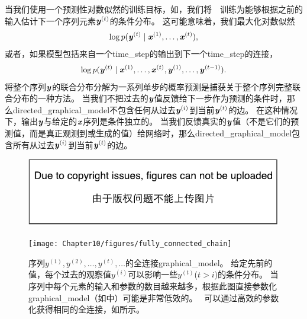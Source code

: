 当我们使用一个预测性对数似然的训练目标，如，我们将~~训练为能够根据之前的输入估计下一个序列元素$\boldsymbol{\mathit{y}}^{(t)}$的条件分布。
这可能意味着，我们最大化对数似然
\begin{align}
 \log p(\boldsymbol{\mathit{y}}^{(t)} \mid \boldsymbol{\mathit{x}}^{(1)},\dots, \boldsymbol{\mathit{x}}^{(t)}),
\end{align}
或者，如果模型包括来自一个\gls{time_step}的输出到下一个\gls{time_step}的连接，
\begin{align}
 \log p(\boldsymbol{\mathit{y}}^{(t)} \mid \boldsymbol{\mathit{x}}^{(1)},\dots, \boldsymbol{\mathit{x}}^{(t)},\boldsymbol{\mathit{y}}^{(1)},\dots, \boldsymbol{\mathit{y}}^{(t-1)} ).
\end{align}
将整个序列$\boldsymbol{\mathit{y}}$的联合分布分解为一系列单步的概率预测是捕获关于整个序列完整联合分布的一种方法。
当我们不把过去的$\boldsymbol{\mathit{y}}$值反馈给下一步作为预测的条件时，那么\gls{directed_graphical_model}不包含任何从过去$\boldsymbol{\mathit{y}}^{(i)}$到当前$\boldsymbol{\mathit{y}}^{(t)}$的边。
在这种情况下，输出$\boldsymbol{\mathit{y}}$与给定的$\boldsymbol{\mathit{x}}$序列是条件独立的。
当我们反馈真实的$\boldsymbol{\mathit{y}}$值（不是它们的预测值，而是真正观测到或生成的值）给网络时，那么\gls{directed_graphical_model}包含所有从过去$\boldsymbol{\mathit{y}}^{(i)}$到当前$\boldsymbol{\mathit{y}}^{(t)}$的边。
\begin{figure}[!htb]
\ifOpenSource
\centerline{\includegraphics{figure.pdf}}
\else
\centerline{\texttt{[image: Chapter10/figures/fully\_connected\_chain]}}
\fi
\caption{序列$y^{(1)},y^{(2)},\dots,y^{(t)},\dots$的全连接\gls{graphical_model}。
给定先前的值，每个过去的观察值$y^{(i)}$可以影响一些$y^{(t)}$($t>i$)的条件分布。
当序列中每个元素的输入和参数的数目越来越多，根据此图直接参数化\gls{graphical_model}（如中）可能是非常低效的。
~可以通过高效的参数化获得相同的全连接，如所示。
}
\label{fig:chap10_fully_connected_chain}
\end{figure}


